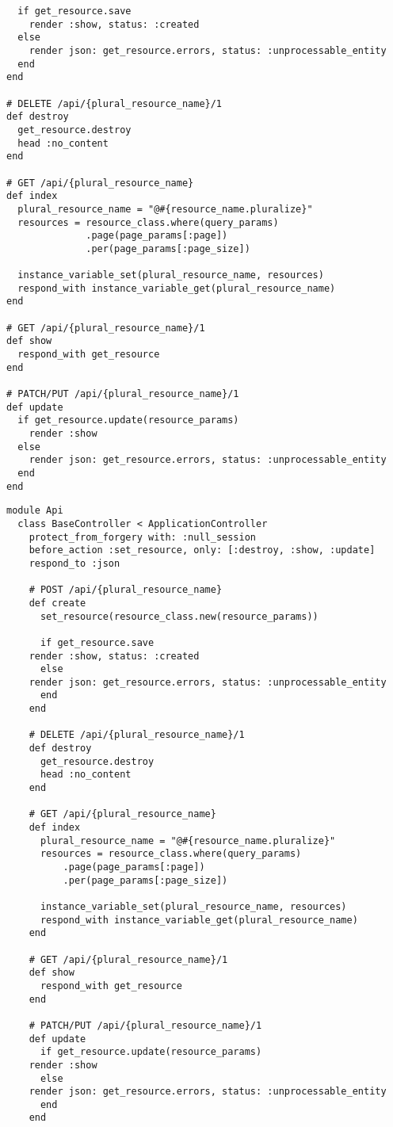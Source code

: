 \documentclass[11pt]{article}
\begin{document}
\begin{itemize}
\begin{itemize}
\begin{itemize}
\begin{verbatim}
  if get_resource.save
    render :show, status: :created
  else
    render json: get_resource.errors, status: :unprocessable_entity
  end
end

# DELETE /api/{plural_resource_name}/1
def destroy
  get_resource.destroy
  head :no_content
end

# GET /api/{plural_resource_name}
def index
  plural_resource_name = "@#{resource_name.pluralize}"
  resources = resource_class.where(query_params)
              .page(page_params[:page])
              .per(page_params[:page_size])

  instance_variable_set(plural_resource_name, resources)
  respond_with instance_variable_get(plural_resource_name)
end

# GET /api/{plural_resource_name}/1
def show
  respond_with get_resource
end

# PATCH/PUT /api/{plural_resource_name}/1
def update
  if get_resource.update(resource_params)
    render :show
  else
    render json: get_resource.errors, status: :unprocessable_entity
  end
end
\end{verbatim}

\begin{verbatim}
module Api
  class BaseController < ApplicationController
    protect_from_forgery with: :null_session
    before_action :set_resource, only: [:destroy, :show, :update]
    respond_to :json

    # POST /api/{plural_resource_name}
    def create
      set_resource(resource_class.new(resource_params))

      if get_resource.save
	render :show, status: :created
      else
	render json: get_resource.errors, status: :unprocessable_entity
      end
    end

    # DELETE /api/{plural_resource_name}/1
    def destroy
      get_resource.destroy
      head :no_content
    end

    # GET /api/{plural_resource_name}
    def index
      plural_resource_name = "@#{resource_name.pluralize}"
      resources = resource_class.where(query_params)
		  .page(page_params[:page])
		  .per(page_params[:page_size])

      instance_variable_set(plural_resource_name, resources)
      respond_with instance_variable_get(plural_resource_name)
    end

    # GET /api/{plural_resource_name}/1
    def show
      respond_with get_resource
    end

    # PATCH/PUT /api/{plural_resource_name}/1
    def update
      if get_resource.update(resource_params)
	render :show
      else
	render json: get_resource.errors, status: :unprocessable_entity
      end
    end


\end{verbatim}
\end{itemize}
\end{itemize}
\end{itemize}
\end{document}
